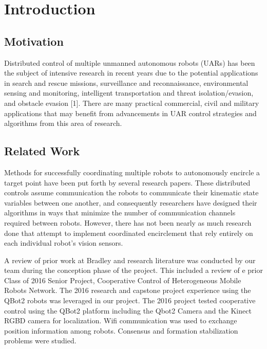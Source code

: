 \documentclass[conference]{IEEEtran}
\begin{document}
%
\IEEEpeerreviewmaketitle



\section{Introduction}

\subsection{Motivation}

Distributed control of multiple unmanned autonomous robots (UARs) has been the subject of intensive research in recent years due to the potential applications in search and rescue missions, surveillance and reconnaissance, environmental sensing and monitoring, intelligent transportation and threat isolation/evasion, and obstacle evasion [1]. There are many practical commercial, civil and military applications that may benefit from advancements in UAR control strategies and algorithms from this area of research. 

\subsection{Related Work}
Methods for successfully coordinating multiple robots to autonomously encircle a target point have been put forth by several research papers.  These distributed controls assume communication the robots to communicate their kinematic state variables between one another, and consequently researchers have designed their algorithms in ways that minimize the number of communication channels required between robots.  However, there has not been nearly as much research done that attempt to implement coordinated encirclement that rely entirely on each individual robot’s vision sensors.

A review of prior work at Bradley and research literature was conducted by our team during the conception phase of the project.  This included a review of e prior Class of 2016 Senior Project, Cooperative Control of Heterogeneous Mobile Robots Network\cite{Wang}. The 2016 research and capstone project experience using the QBot2 robots was leveraged in our project. The 2016 project tested cooperative control using the QBot2 platform including the Qbot2 Camera and the Kinect RGBD camera for localization.  Wiﬁ communication was used to exchange position information among robots. Consensus and formation stabilization problems were studied. 
\end{document}
